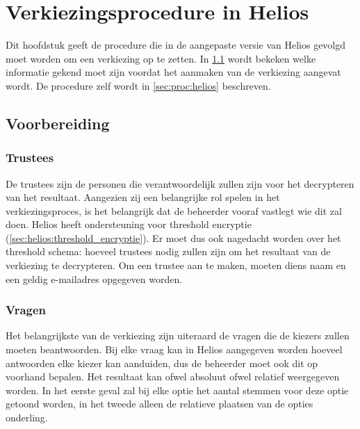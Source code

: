 % 
%

\chapter{Verkiezingsprocedure in Helios}
\label{chap:procedure}

Dit hoofdstuk geeft de procedure die in de aangepaste versie van Helios gevolgd moet worden om een verkiezing op te zetten. In \ref{sec:proc:voorbereiding} wordt bekeken welke informatie gekend moet zijn voordat het aanmaken van de verkiezing aangevat wordt. De procedure zelf wordt in \ref{sec:proc:helios} beschreven.

\section{Voorbereiding}
\label{sec:proc:voorbereiding}

\subsection{Trustees}

De trustees zijn de personen die verantwoordelijk zullen zijn voor het decrypteren van het resultaat. Aangezien zij een belangrijke rol spelen in het verkiezingsproces, is het belangrijk dat de beheerder vooraf vastlegt wie dit zal doen. Helios heeft ondersteuning voor threshold encryptie (\ref{sec:helios:threshold_encryptie}). Er moet dus ook nagedacht worden over het threshold schema: hoeveel trustees nodig zullen zijn om het resultaat van de verkiezing te decrypteren. Om een trustee aan te maken, moeten diens naam en een geldig e-mailadres opgegeven worden.

\subsection{Vragen}
\label{sec:proc:voorbereiding:vragen}

Het belangrijkste van de verkiezing zijn uiteraard de vragen die de kiezers zullen moeten beantwoorden. Bij elke vraag kan in Helios aangegeven worden hoeveel antwoorden elke kiezer kan aanduiden, dus de beheerder moet ook dit op voorhand bepalen. Het resultaat kan ofwel absoluut ofwel relatief weergegeven worden. In het eerste geval zal bij elke optie het aantal stemmen voor deze optie getoond worden, in het tweede alleen de relatieve plaatsen van de opties onderling.

